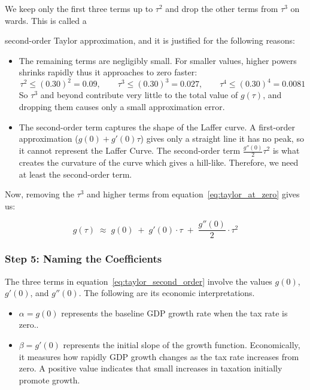 \documentclass[12pt,a4paper]{report}
\theoremstyle{definition}
\theoremstyle{plain}
\theoremstyle{remark}
\begin{document}
	We keep only the first three terms up to $\tau^2$ and drop the other terms from $\tau^3$ on wards. This is called a {second-order Taylor approximation,
		and it is justified for the following reasons:
		
		\begin{itemize}
			\item {The remaining terms are negligibly small.}
			For smaller values, higher powers shrinks rapidly thus it approaches to zero faster:
			\[
			\tau^2 \leq (0.30)^2 = 0.09, \qquad
			\tau^3 \leq (0.30)^3 = 0.027, \qquad
			\tau^4 \leq (0.30)^4 = 0.0081
			\]
			So $\tau^3$ and beyond contribute very little to the total value of $g(\tau)$,
			and dropping them causes only a small approximation error.
			
			\item {The second-order term captures the shape of the Laffer curve.}
			A first-order approximation ($g(0) + g'(0)\tau$) gives only a straight line it has no peak, so it cannot represent the Laffer Curve.
			The second-order term $\frac{g''(0)}{2}\tau^2$ is what creates the
			curvature of the curve which gives a hill-like. Therefore, we need
			at least the second-order term.
			
		\end{itemize}
		Now, removing the $\tau^3$ and higher terms from equation~\eqref{eq:taylor_at_zero} gives us:
		
		\begin{equation}
			g(\tau) \;\approx\; g(0) \;+\; g'(0)\cdot\tau \;+\; \frac{g''(0)}{2}\cdot\tau^2
			\label{eq:taylor_second_order}
		\end{equation}
		
		\subsubsection*{Step 5: Naming the Coefficients}
		
		The three terms in equation~\eqref{eq:taylor_second_order} involve the values
		$g(0)$, $g'(0)$, and $g''(0)$. The following are its economic interpretations.
		
		\medskip
		
		\begin{itemize}
			\item \textbf{\(\alpha = g(0)\)} represents the baseline GDP growth rate when the tax rate is zero..
			
			\item \textbf{\(\beta = g'(0)\)} represents the initial slope of the growth function. Economically, it measures how rapidly GDP growth changes as the tax rate increases from zero. A positive value indicates that small increases in taxation initially promote growth.
			

\end{itemize}}
\end{document}

